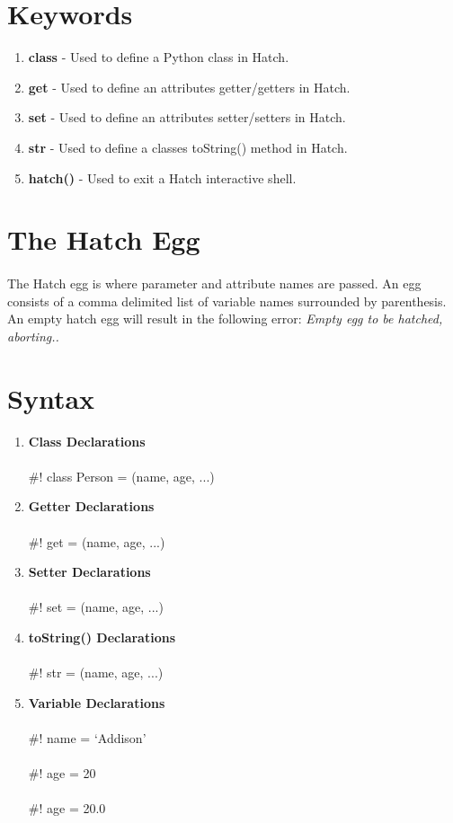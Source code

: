 \documentclass[12pt]{article}
\begin{document}
\section{Keywords}
\begin{enumerate}
\item{\textbf{class}}
- Used to define a Python class in Hatch.
\item{\textbf{get}}
- Used to define an attributes getter/getters in Hatch.
\item{\textbf{set}}
- Used to define an attributes setter/setters in Hatch.
\item{\textbf{str}}
- Used to define a classes toString() method in Hatch.
\item{\textbf{hatch()}}
- Used to exit a Hatch interactive shell.
\end{enumerate}

\section{The Hatch Egg}
\paragraph{}The Hatch egg is where parameter and attribute names are passed.  An egg consists of a comma delimited list of variable names surrounded by parenthesis.  An empty hatch egg will result in the following error: \textit{Empty egg to be hatched, aborting..}

\section{Syntax}
\begin{enumerate}
\item{\textbf{Class Declarations}} \\ \\
\#! class Person = (name, age, ...)
\item{\textbf{Getter Declarations}} \\ \\
\#! get = (name, age, ...)
\item{\textbf{Setter Declarations}} \\ \\
\#! set = (name, age, ...)
\item{\textbf{toString() Declarations}} \\ \\
\#! str = (name, age, ...)
\item{\textbf{Variable Declarations}} \\ \\
\#! name = `Addison' \\ \\
\#! age = 20 \\ \\
\#! age = 20.0 \\ \\
\end{enumerate}
\end{document}
